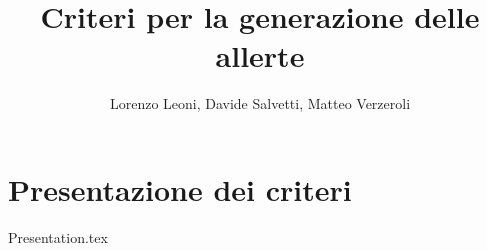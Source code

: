 \documentclass[
a4paper,
cleardoublepage=empty,
headings=twolinechapter,
numbers=autoenddot,
]{article}
\title{Criteri per la generazione delle allerte}
\author{Lorenzo Leoni, Davide Salvetti, Matteo Verzeroli}
\begin{document}
	\maketitle
	\section{Presentazione dei criteri}
	{Presentation.tex}	
\end{document}
